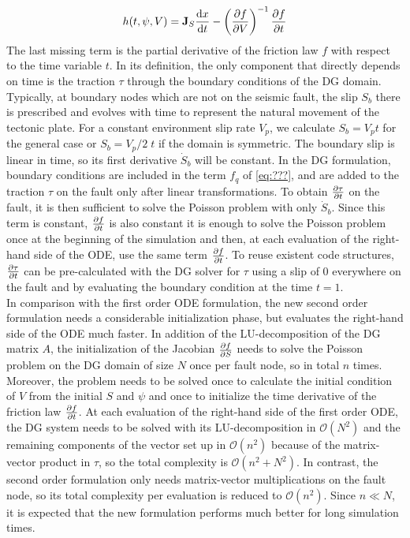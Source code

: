 \begin{equation}
	\label{eq:2nd_order_ODE_formulation_concise}
	h(t,\psi,V) = \mathbf{J}_{S}\dv{x}{t} -\left(\pdv{f}{V}\right)^{-1}\pdv{f}{t}
\end{equation}
The last missing term is the partial derivative of the friction law $f$ with respect to the time variable $t$. In its definition, the only component that directly depends on time is the traction $\tau$ through the boundary conditions of the DG domain. Typically, at boundary nodes which are not on the seismic fault, the slip $S_b$ there is prescribed and evolves with time to represent the natural movement of the tectonic plate. For a constant environment slip rate $V_p$, we calculate $S_b=V_pt$ for the general case or $S_b=V_p/2\;t$ if the domain is symmetric. The boundary slip is linear in time, so its first derivative $\dot{S}_b$ will be constant. In the DG formulation, boundary conditions are included in the term $f_q$ of \autoref{eq:???}, and are added to the traction $\tau$ on the fault only after linear transformations. To obtain $\pdv{\tau}{t}$ on the fault, it is then sufficient to solve the Poisson problem with only $\dot{S}_b$. Since this term is constant, $\pdv{f}{t}$ is also constant it is enough to solve the Poisson problem once at the beginning of the simulation and then, at each evaluation of the right-hand side of the ODE, use the same term $\pdv{f}{t}$. To reuse existent code structures, $\pdv{\tau}{t}$ can be pre-calculated with the DG solver for $\tau$ using a slip of 0 everywhere on the fault and by evaluating the boundary condition at the time $t=1$. \\
In comparison with the first order ODE formulation, the new second order formulation needs a considerable initialization phase, but evaluates the right-hand side of the ODE much faster. In addition of the LU-decomposition of the DG matrix $A$, the initialization of the Jacobian $\pdv{f}{S}$ needs to solve the Poisson problem on the DG domain of size $N$ once per fault node, so in total $n$ times. Moreover, the problem needs to be solved once to calculate the initial condition of $V$ from the initial $S$ and $\psi$ and once to initialize the time derivative of the friction law $\pdv{f}{t}$. At each evaluation of the right-hand side of the first order ODE, the DG system needs to be solved with its LU-decomposition in $\mathcal{O}\left(N^2\right)$ and the remaining components of the vector set up in $\mathcal{O}\left(n^2\right)$ because of the matrix-vector product in $\tau$, so the total complexity is $\mathcal{O}\left(n^2+N^2\right)$. In contrast, the second order formulation only needs matrix-vector multiplications on the fault node, so its total complexity per evaluation is reduced to $\mathcal{O}\left(n^2\right)$. Since $n\ll N$, it is expected that the new formulation performs much better for long simulation times. \\

